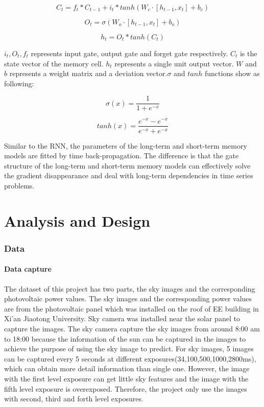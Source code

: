 \begin{equation}
	C_{t}=f_{t}*C_{t-1}+i_{t}*tanh(W_{c}\cdot[h_{t-1},x_{t}] + b_{c})
\end{equation}	


\begin{equation}
	O_{t}=\sigma (W_{o}\cdot[h_{t-1},x_{t}] + b_{o})
\end{equation}	

\begin{equation}
	h_{t}=O_{t}*tanh(C_{t})
\end{equation}	

$i_{t},O_{t},f_{t}$ represents input gate, output gate and forget gate respectively. $C_{t}$ is the state vector of the memory cell.
	$h_{t}$  represents a single unit output vector. $W$ and $b$ represents a weight matrix and a deviation vector.$\sigma$ and $tanh$ functions show as following:

\begin{equation}
	\sigma (x)=\frac{1}{1+e^{-x}}
\end{equation}

\begin{equation}
	tanh(x)=\frac{e^{-x}-e^{-x}}{e^{-x}+e^{-x}}
\end{equation}	
		
		
Similar to the RNN, the parameters of the long-term and short-term memory models are fitted by time back-propagation. The difference is that the gate structure of the long-term and short-term memory models can effectively solve the  gradient disappearance and deal with long-term dependencies in time series problems.
	
	






\chapter{Analysis and Design}
\subsection{Data}
\subsubsection{Data capture}
The dataset of this project has two parts, the sky images and  the corresponding photovoltaic power values.
The sky images and  the corresponding  power values are from the photovoltaic panel which was installed on the roof of EE building in Xi'an Jiaotong University. Sky camera was installed near the solar panel to capture the images. The sky camera capture the sky images from around 8:00 am to 18:00 because the information of the sun can be captured in the images to achieve the purpose of using the sky image to predict. For sky images, 5 images can be captured every 5 seconds at different exposures({34,100,500,1000,2800}ms), which can obtain more detail information than single one. 
However, the image with the  first level exposure can get little sky features and the image with the fifth level exposure is overexposed. Therefore, the project only use the images with second, third and forth level exposures.

